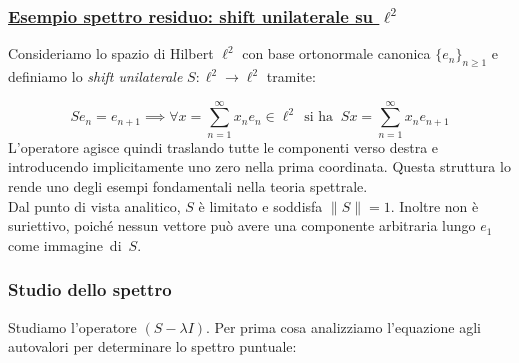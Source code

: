 \documentclass[a4paper,12pt]{report}
\begin{document}
\newpage

\subsubsection{\underline{Esempio spettro residuo: shift unilaterale su $\ell^2$}}

Consideriamo lo spazio di Hilbert $\ell^2$ con base ortonormale canonica $\{e_n\}_{n\ge1}$ e definiamo lo \emph{shift unilaterale} $S : \ell^2 \to \ell^2$ tramite: 

\[
S e_n = e_{n+1}\implies \forall x=\sum_{n=1}^\infty x_ne_n\in \ell^2 \ \ \text{si ha } \ 
Sx = \sum_{n=1}^\infty x_n e_{n+1}
\]
L’operatore agisce quindi traslando tutte le componenti verso destra e introducendo implicitamente uno zero nella prima coordinata. Questa struttura lo rende uno degli esempi fondamentali nella teoria spettrale.
\\Dal punto di vista analitico, $S$ è limitato e soddisfa $\|S\|=1$. Inoltre non è suriettivo, poiché nessun vettore può avere una componente arbitraria lungo $e_1$ come \mbox{immagine di $S$}.

\subsubsection{Studio dello spettro}

Studiamo l’operatore $(S-\lambda I)$. Per prima cosa analizziamo l'equazione agli autovalori per determinare lo spettro puntuale:
\end{document}
